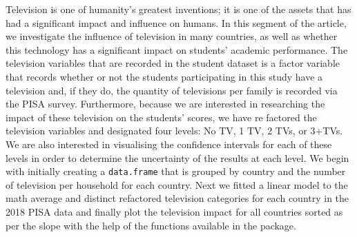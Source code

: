 Television is one of humanity's greatest inventions; it is one of the
assets that has had a significant impact and influence on humans. In
this segment of the article, we investigate the influence of television
in many countries, as well as whether this technology has a significant
impact on students' academic performance. The television variables that
are recorded in the student dataset is a factor variable that records
whether or not the students participating in this study have a
television and, if they do, the quantity of televisions per family is
recorded via the PISA survey. Furthermore, because we are interested in
researching the impact of these television on the students' scores, we
have re factored the television variables and designated four levels: No
TV, 1 TV, 2 TVs, or 3+TVs. We are also interested in visualising the
confidence intervals for each of these levels in order to determine the
uncertainty of the results at each level. We begin with initially
creating a \texttt{data.frame} that is grouped by country and the number
of television per household for each country. Next we fitted a linear
model to the math average and distinct refactored television categories
for each country in the 2018 PISA data and finally plot the television
impact for all countries sorted as per the slope with the help of the
functions available in the  \citep{ggplot2} package.

